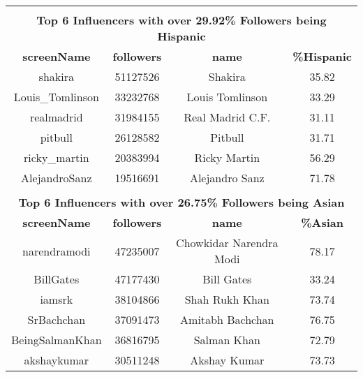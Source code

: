 \begin{table}
\begin{center}
\begin{tabular}{|c|c|c|c|}
\hline
\multicolumn{4}{c}{}\\
\multicolumn{4}{c}{\bfseries Top 6 Influencers with over 29.92\% Followers being Hispanic}\\
\hline
\bfseries screenName & \bfseries followers & \bfseries name & \bfseries {\%}Hispanic\\
\hline
shakira & 51127526 & Shakira & 35.82 \\
\hline
Louis{\_}Tomlinson & 33232768 & Louis Tomlinson & 33.29 \\
\hline
realmadrid & 31984155 & Real Madrid C.F. & 31.11 \\
\hline
pitbull & 26128582 & Pitbull & 31.71 \\
\hline
ricky{\_}martin & 20383994 & Ricky Martin & 56.29 \\
\hline
AlejandroSanz & 19516691 & Alejandro Sanz & 71.78 \\
\hline
\multicolumn{4}{c}{}\\
\multicolumn{4}{c}{\bfseries Top 6 Influencers with over 26.75\% Followers being Asian}\\
\hline
\bfseries screenName & \bfseries followers & \bfseries name & \bfseries {\%}Asian\\
\hline
narendramodi & 47235007 & Chowkidar Narendra Modi & 78.17 \\
\hline
BillGates & 47177430 & Bill Gates & 33.24 \\
\hline
iamsrk & 38104866 & Shah Rukh Khan & 73.74 \\
\hline
SrBachchan & 37091473 &Amitabh Bachchan& 76.75 \\
\hline
BeingSalmanKhan & 36816795 & Salman Khan & 72.79 \\
\hline
akshaykumar & 30511248 & Akshay Kumar & 73.73 \\
\hline
\end{tabular}
\end{center}
\end{table}

